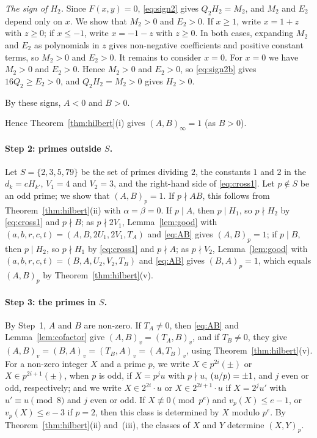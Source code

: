\documentclass[11pt]{article}
\newcommand{\leg}[2]{\mathchoice{\biggl(\dfrac{#1}{#2}\biggr)}{(#1/#2)}{(#1/#2)}{(#1/#2)}}
\begin{document}
\emph{The sign of $H_{2}$.} Since $F(x,y)=0$, \eqref{eq:sign2} gives $Q_{2}H_{2}=M_{2}$, and $M_{2}$ and $E_{2}$ depend only on $x$. We show that $M_{2}>0$ and $E_{2}>0$. If $x\geq1$, write $x=1+z$ with $z\geq0$; if $x\leq-1$, write $x=-1-z$ with $z\geq0$. In both cases, expanding $M_{2}$ and $E_{2}$ as polynomials in $z$ gives non-negative coefficients and positive constant terms, so $M_{2}>0$ and $E_{2}>0$. It remains to consider $x=0$. For $x=0$ we have $M_{2}>0$ and $E_{2}>0$. Hence $M_{2}>0$ and $E_{2}>0$, so \eqref{eq:sign2b} gives $16Q_{2}\geq E_{2}>0$, and $Q_{2}H_{2}=M_{2}>0$ gives $H_{2}>0$.

By these signs, $A<0$ and $B>0$.

Hence Theorem~\ref{thm:hilbert}(i) gives $(A,B)_\infty=1$ (as $B>0$).

\paragraph{Step 2: primes outside $S$.} Let $S=\{2,3,5,79\}$ be the set of primes dividing $2$, the constants $1$ and $2$ in the $d_k=cH_{k'}$, $V_{1}=4$ and $V_{2}=3$, and the right-hand side of \eqref{eq:cross1}. Let $p\notin S$ be an odd prime; we show that $(A,B)_p=1$. If $p\nmid AB$, this follows from Theorem~\ref{thm:hilbert}(ii) with $\alpha=\beta=0$. If $p\mid A$, then $p\mid H_{1}$, so $p\nmid H_{2}$ by \eqref{eq:cross1} and $p\nmid B$; as $p\nmid 2V_{1}$, Lemma~\ref{lem:good} with $(a,b,r,c,t)=(A,B,2U_{1},2V_{1},T_A)$ and \eqref{eq:AB} gives $(A,B)_p=1$; if $p\mid B$, then $p\mid H_{2}$, so $p\nmid H_{1}$ by \eqref{eq:cross1} and $p\nmid A$; as $p\nmid V_{2}$, Lemma~\ref{lem:good} with $(a,b,r,c,t)=(B,A,U_{2},V_{2},T_B)$ and \eqref{eq:AB} gives $(B,A)_p=1$, which equals $(A,B)_p$ by Theorem~\ref{thm:hilbert}(v).

\paragraph{Step 3: the primes in $S$.} By Step~1, $A$ and $B$ are non-zero. If $T_A\neq0$, then \eqref{eq:AB} and Lemma~\ref{lem:cofactor} give $(A,B)_v=(T_A,B)_v$, and if $T_B\neq0$, they give $(A,B)_v=(B,A)_v=(T_B,A)_v=(A,T_B)_v$, using Theorem~\ref{thm:hilbert}(v). For a non-zero integer $X$ and a prime $p$, we write $X\in p^{2i}(\pm)$ or $X\in p^{2i+1}(\pm)$, when $p$ is odd, if $X=p^ju$ with $p\nmid u$, $\leg{u}{p}=\pm1$, and $j$ even or odd, respectively; and we write $X\in2^{2i}\cdot u$ or $X\in2^{2i+1}\cdot u$ if $X=2^ju'$ with $u'\equiv u\pmod 8$ and $j$ even or odd. If $X\not\equiv0\pmod{p^e}$ and $v_p(X)\leq e-1$, or $v_p(X)\leq e-3$ if $p=2$, then this class is determined by $X$ modulo $p^e$. By Theorem~\ref{thm:hilbert}(ii) and~(iii), the classes of $X$ and $Y$ determine $(X,Y)_p$.
\end{document}
